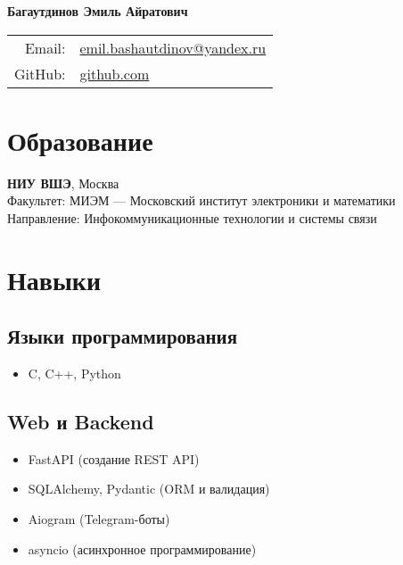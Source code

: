 \documentclass[a4paper,12pt]{article}
\begin{document}
	
	\begin{center}
		\Large\textbf{Багаутдинов Эмиль Айратович} \\
		\normalsize
		\vspace{5pt}
		\begin{tabular}{rl}
			Email: & \href{mailto:emil.bashautdinov@yandex.ru}{emil.bashautdinov@yandex.ru} \\
			GitHub: & \href{https://github.com/dmngwtf}{github.com} \\
		\end{tabular}
	\end{center}
	
	\vspace{10pt}
	
	\section*{Образование}
	\textbf{НИУ ВШЭ}, Москва \\
	Факультет: МИЭМ — Московский институт электроники и математики \\
	Направление: Инфокоммуникационные технологии и системы связи
	
	\vspace{10pt}
	
	\section*{Навыки}
	
	\subsection*{Языки программирования}
	\begin{itemize}[leftmargin=1.5em]
		\item C, C++, Python
	\end{itemize}
	
	\subsection*{Web и Backend}
	\begin{itemize}[leftmargin=1.5em]
		\item FastAPI (создание REST API)
		\item SQLAlchemy, Pydantic (ORM и валидация)
		\item Aiogram (Telegram-боты)
		\item asyncio (асинхронное программирование)
	\end{itemize}
	
\end{document}
